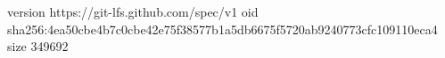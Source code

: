 version https://git-lfs.github.com/spec/v1
oid sha256:4ea50cbe4b7c0cbe42e75f38577b1a5db6675f5720ab9240773cfc109110eca4
size 349692
